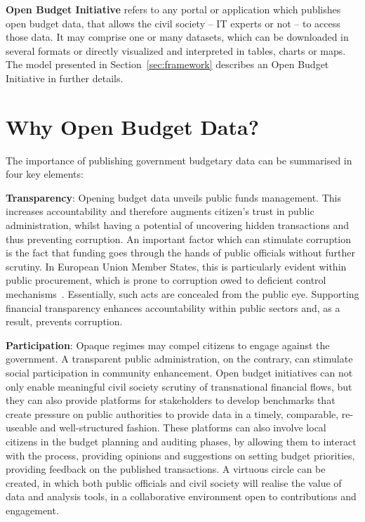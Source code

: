 \hspace{.8cm}
\begin{defn}
\textbf{Open Budget Initiative} refers to any portal or application which publishes open budget data, that allows the civil society -- IT experts or not -- to access those data. 
It may comprise one or many datasets, which can be downloaded in several formats or directly visualized and interpreted in tables, charts or maps.
The model presented in Section~\ref{sec:framework} describes an Open Budget Initiative in further details.
\end{defn}

\section{Why Open Budget Data?}
\label{sec:whybudgetdata}

The importance of publishing government budgetary data can be summarised in four key elements:

\hspace{.8cm}

\noindent\textbf{Transparency}: Opening budget data unveils public funds management. 
This increases accountability and therefore augments citizen's trust in public administration, whilst having a potential of uncovering hidden transactions and thus preventing corruption. 
An important factor which can stimulate corruption is the fact that funding goes through the hands of public officials without further scrutiny. 
In European Union Member States, this is particularly evident within public procurement, which is prone to corruption owed to deficient control
mechanisms~\cite{EuropeanComission2014}.
Essentially, such acts are concealed from the public eye. 
Supporting financial transparency enhances accountability within public sectors and, as a result, prevents corruption. 

\hspace{.8cm}

\noindent\textbf{Participation}: Opaque regimes may compel citizens to engage against the government. 
A transparent public administration, on the contrary, can stimulate social participation in community enhancement.
Open budget initiatives can not only enable meaningful civil society scrutiny of transnational financial flows, but they can also provide platforms for stakeholders to develop benchmarks that create pressure on public authorities to provide data in a timely, comparable, re-useable and well-structured fashion. 
These platforms can also involve local citizens in the budget planning and auditing phases, by allowing them to interact with the process, providing opinions and suggestions on setting budget priorities, providing feedback on the published transactions.
A virtuous circle can be created, in which both public officials and civil society will realise the value of data and analysis tools, in a collaborative environment open to contributions and engagement. 

